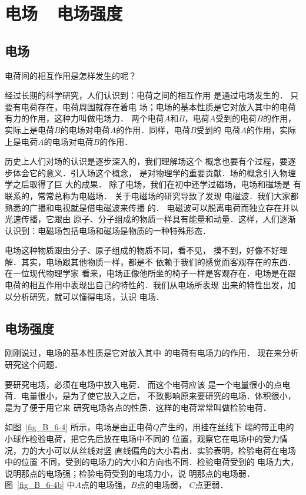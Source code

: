 \section{电场~~电场强度}

\subsection{电场}
电荷间的相互作用是怎样发生的呢？

经过长期的科学研究，人们认识到：电荷之间的相互作用
是通过电场发生的．
只要有电荷存在，电荷周围就存在着电
场；电场的基本性质是它对放入其中的电荷有力的作用，这种力叫做电场力．
两个电荷$A$和$B$，电荷$A$受到的电荷$B$的作用，
实际上是电荷$B$的电场对电荷$A$的作用．同样，电荷$B$受到的
电荷$A$的作用，实际上是电荷$A$的电场对电荷$B$的作用．

历史上人们对场的认识是逐步深入的，我们理解场这个
概念也要有个过程，要逐步体会它的意义．引入场这个概念，
是对物理学的重要贡献．场的概念引入物理学之后取得了巨
大的成果．
除了电场，我们在初中还学过磁场，电场和磁场是
有联系的，常常总称为电磁场．
关于电磁场的研究导致了发现
电磁波．我们大家都熟悉的广播和电视就是借电磁波来传播
的．
电磁波可以脱离电荷而独立存在并以光速传播，它跟由
原子、分子组成的物质一样具有能量和动量．这样，人们逐渐
认识到：电磁场包括电场和磁场是物质的一种特殊形态．

电场这种物质跟由分子、原子组成的物质不同，看不见，
摸不到，好像不好理解．其实，电场跟其他物质一样，都是不
依赖于我们的感觉而客观存在的东西．在一位现代物理学家
看来，电场正像他所坐的椅子一样是客观存在．电场是在跟
电荷的相互作用中表现出自己的特性的．我们从电场所表现
出来的特性出发，加以分析研究，就可以懂得电场，认识
电场．

\subsection{电场强度} 

刚刚说过，电场的基本性质是它对放入其中
的电荷有电场力的作用．
现在来分析研究这个问题．

要研究电场，必须在电场中放入电荷．
而这个电荷应该
是一个电量很小的点电荷．电量很小，是为了使它放入之后，
不致影响原来要研究的电场．体积很小，是为了便于用它来
研究电场各点的性质．这样的电荷常常叫做检验电荷．


如图~\ref{fig_B_6-4} 所示，电场是由正电荷$Q$产生的，用挂在丝线下
端的带正电的小球作检验电荷，把它先后放在电场中不同的
位置，观察它在电场中的受力情况，力的大小可以从丝线对竖
直线偏角的大小看出．实验表明，检验电荷在电场中的位置
不同，受到的电场力的大小和方向也不同．检验电荷受到的
电场力大，说明那点的电场强；检验电荷受到的电场力小，说
明那点的电场弱．图~\ref{fig_B_6-4b} 中$A$点的电场强，$B$点的电场弱，
$C$点更弱．


